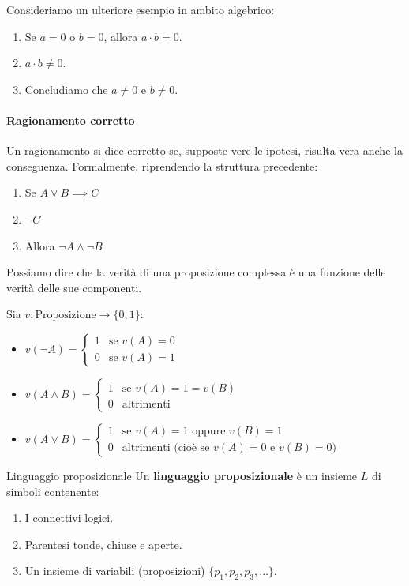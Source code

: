 \documentclass[12pt]{report}
\begin{document}
	Consideriamo un ulteriore esempio in ambito algebrico:
	\begin{enumerate}
		\item Se $a = 0$ o $b = 0$, allora $a \cdot b = 0$.
		\item $a \cdot b \neq 0$.
		\item Concludiamo che $a \neq 0$ e $b \neq 0$.
	\end{enumerate}
	
	\paragraph{Ragionamento corretto}
	Un ragionamento si dice corretto se, supposte vere le ipotesi, risulta vera anche la conseguenza. Formalmente, riprendendo la struttura precedente:
	\begin{enumerate}
		\item Se $A \lor B \implies C$
		\item $\neg C$
		\item Allora $\neg A \land \neg B$
	\end{enumerate}
	
	Possiamo dire che la verità di una proposizione complessa è una funzione delle verità delle sue componenti.
	
	Sia $v: \text{Proposizione} \to \{0, 1\}$:
	\begin{itemize}
		\item $v(\neg A) = \begin{cases} 1 & \text{se } v(A) = 0 \\ 0 & \text{se } v(A) = 1 \end{cases}$
		\item $v(A \land B) = \begin{cases} 1 & \text{se } v(A) = 1 = v(B) \\ 0 & \text{altrimenti} \end{cases}$
		\item $v(A \lor B) = \begin{cases} 1 & \text{se } v(A) = 1 \text{ oppure } v(B) = 1 \\ 0 & \text{altrimenti (cioè se } v(A) = 0 \text{ e } v(B) = 0) \end{cases}$
	\end{itemize}
	
	\begin{definizione}{Linguaggio proposizionale}{}
		Un \textbf{linguaggio proposizionale} è un insieme $L$ di simboli contenente:
		\begin{enumerate}
			\item I connettivi logici.
			\item Parentesi tonde, chiuse e aperte.
			\item Un insieme di variabili (proposizioni) $\{p_1, p_2, p_3, \dots\}$.
		\end{enumerate}
	\end{definizione}
	
\end{document}
